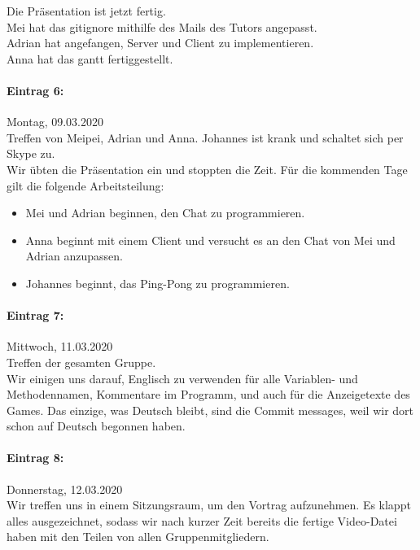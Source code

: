 \documentclass[12pt]{article}
\begin{document}
\noindent Die Pr\"asentation  ist jetzt fertig.\\
Mei hat das gitignore mithilfe des Mails des Tutors angepasst.\\
Adrian hat angefangen, Server und Client zu implementieren.\\ 
Anna hat das gantt fertiggestellt.

\paragraph{Eintrag 6:}
Montag, 09.03.2020\\
Treffen von Meipei, Adrian und Anna. Johannes ist krank und schaltet sich per Skype zu.\\
Wir \"ubten die Pr\"asentation ein und stoppten die Zeit. F\"ur die kommenden Tage gilt die folgende Arbeitsteilung:
\begin{itemize} 
\item Mei und Adrian beginnen, den Chat zu programmieren.
\item Anna beginnt mit einem Client und versucht es an den Chat von Mei und Adrian anzupassen.
\item Johannes beginnt, das Ping-Pong zu programmieren.
\end{itemize}

\paragraph{Eintrag 7:}
Mittwoch, 11.03.2020\\
Treffen der gesamten Gruppe.\\
Wir einigen uns darauf, Englisch zu verwenden f\"ur alle Variablen- und Methodennamen, Kommentare im Programm, und auch f\"ur die Anzeigetexte des Games. Das einzige, was Deutsch bleibt, sind die Commit messages, weil wir dort schon auf Deutsch begonnen haben.\\

\paragraph{Eintrag 8:}
Donnerstag, 12.03.2020\\
Wir treffen uns in einem Sitzungsraum, um den Vortrag aufzunehmen. Es klappt alles ausgezeichnet, sodass wir nach kurzer Zeit bereits die fertige Video-Datei haben mit den Teilen von allen Gruppenmitgliedern.
\end{document}
